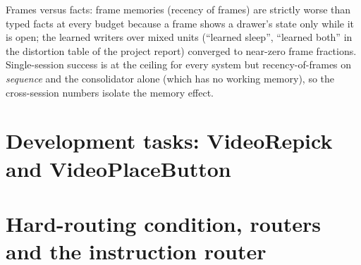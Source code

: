 \documentclass{article}
\begin{document}
Frames versus facts: frame memories (recency of frames) are strictly worse than typed facts at every budget because a frame shows a drawer's state only while it is open; the learned writers over mixed units (``learned sleep'', ``learned both'' in the distortion table of the project report) converged to near-zero frame fractions. Single-session success is at the ceiling for every system but recency-of-frames on \emph{sequence} and the consolidator alone (which has no working memory), so the cross-session numbers isolate the memory effect.

\section{Development tasks: VideoRepick and VideoPlaceButton}
\label{app:dev}
\begin{table}[h]
\centering\small
\caption{Success at $k=0/3/7$ ($n{=}50$ per cell, test split); ``='' repeats the released $k{=}0$ cell. The oracle and retrieval rows agree to within one episode because retrieval picks the lesson in every draw.}
\label{tab:budget}
\setlength{\tabcolsep}{4pt}
\end{table}

\section{Hard-routing condition, routers and the instruction router}
\label{app:hard}
\end{document}
